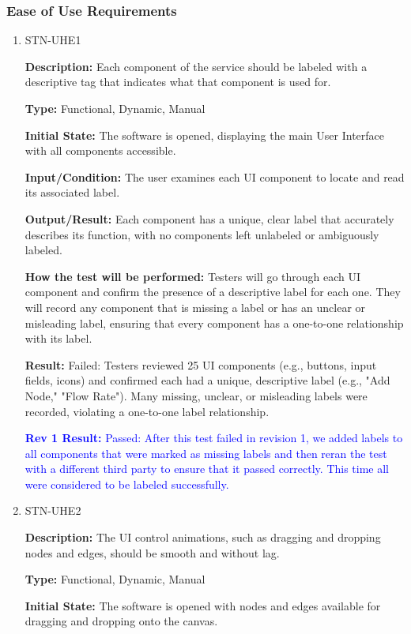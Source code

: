 \documentclass[12pt, titlepage]{article}
\begin{document}
\subsubsection{Ease of Use Requirements}
\begin{enumerate}
\item{STN-UHE1\\}

\textbf{Description:} Each component of the service should be labeled with a descriptive tag that indicates what that component is used for.

\textbf{Type:} Functional, Dynamic, Manual

\textbf{Initial State:} The software is opened, displaying the main User Interface with all components accessible.

\textbf{Input/Condition:} The user examines each UI component to locate and read its associated label.

\textbf{Output/Result:} Each component has a unique, clear label that accurately describes its function, with no components left unlabeled or ambiguously labeled.

\textbf{How the test will be performed:} Testers will go through each UI component and confirm the presence of a descriptive label for each one. They will record any component that is missing a label or has an unclear or misleading label, ensuring that every component has a one-to-one relationship with its label.

\textbf{Result:} Failed: Testers reviewed 25 UI components (e.g., buttons, input fields, icons) and confirmed each had a unique, descriptive label (e.g., "Add Node," "Flow Rate"). Many missing, unclear, or misleading labels were recorded, violating a one-to-one label relationship.

\textcolor{blue}{\textbf{Rev 1 Result:} Passed: After this test failed in revision 1, we added labels to all components that were marked as missing labels and then reran the test with a different third party to ensure that it passed correctly. This time all were considered to be labeled successfully.}
\item{STN-UHE2\\}

\textbf{Description:} The UI control animations, such as dragging and dropping nodes and edges, should be smooth and without lag.

\textbf{Type:} Functional, Dynamic, Manual

\textbf{Initial State:} The software is opened with nodes and edges available for dragging and dropping onto the canvas.


\end{enumerate}
\end{document}
